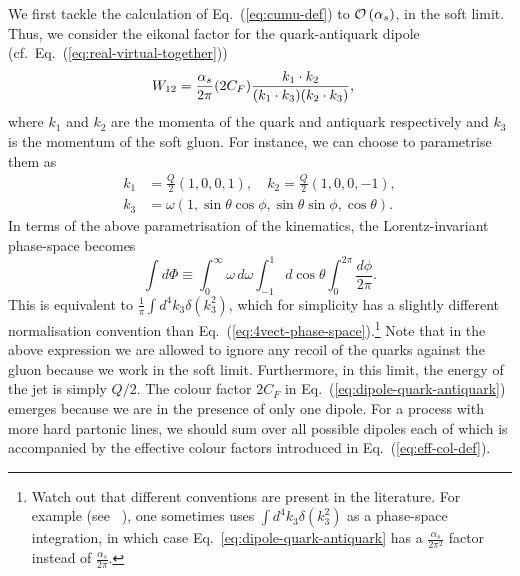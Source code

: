 We first tackle the calculation of Eq.~(\ref{eq:cumu-def}) to $\mathcal{O}
\left(\alpha_s \right)$, in the soft limit. Thus, we consider the eikonal
factor for the quark-antiquark dipole (cf.~Eq.~(\ref{eq:real-virtual-together}))
\begin{align}\label{eq:dipole-quark-antiquark}
W_{12}&= \frac{\alpha_s}{2 \pi} (2 C_F) \frac{k_1 \cdot k_2}{(k_1 \cdot k_3)(k_2 \cdot k_3)},
\end{align}
where $k_1$ and $k_2$ are the momenta of the quark and antiquark respectively and $k_3$ is the momentum of the soft gluon. For instance, we can choose to parametrise them as
\begin{align}
k_1&=\frac{Q}{2} \left(1,0,0,1 \right), \quad k_2=\frac{Q}{2} \left(1,0,0,-1 \right), \nonumber\\
k_3&= \omega \left(1, \sin \theta \cos \phi, \sin \theta \sin \phi, \cos \theta \right).
\end{align}
In terms of the above parametrisation of the kinematics, the Lorentz-invariant phase-space becomes
\begin{equation}\label{eq:phase-space-integration}
\int d\Phi\equiv \int_0^\infty \omega\, d\omega \int_{-1}^1 d\cos \theta \int_0^{2\pi}\frac{d\phi}{2\pi}.
\end{equation}
This is equivalent to $\tfrac{1}{\pi}\int d^4k_3\delta(k_3^2)$, which
for simplicity has a slightly different normalisation convention
than Eq.~(\ref{eq:4vect-phase-space}).\footnote{Watch out that
  different conventions are present in the literature. For example
  (see \eg~\cite{Dasgupta:2007wa}), one sometimes uses
  $\int d^4k_3\delta(k_3^2)$ as a phase-space integration, in which
  case Eq.~\eqref{eq:dipole-quark-antiquark} has a
  $\tfrac{\alpha_s}{2\pi^2}$ factor instead of
  $\tfrac{\alpha_s}{2\pi}$.}  Note that in the above expression we are
allowed to ignore any recoil of the quarks against the gluon because
we work in the soft limit. Furthermore, in this limit, the energy of
the jet is simply $Q/2$.
%
The colour factor $2 C_F$ in Eq.~(\ref{eq:dipole-quark-antiquark})
emerges because we are in the presence of only one dipole. For a
process with more hard partonic lines, we should sum over all possible
dipoles each of which is accompanied by the effective colour factors
introduced in Eq.~(\ref{eq:eff-col-def}).


